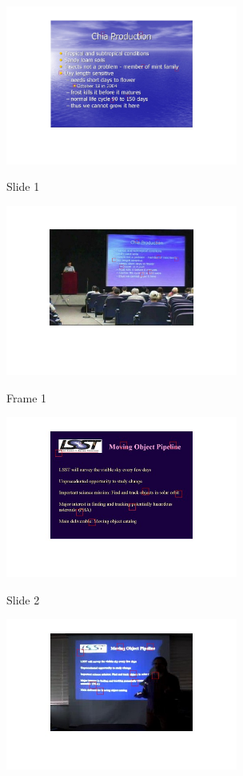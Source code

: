 \clearpage
\begin{figure}[ht]
	\begin{subfigure}{0.5\textwidth}
	    {\includegraphics[width=3in]{figs/vizSlidePts_1.jpg}}
		\caption{Slide 1}
	\end{subfigure}
	\begin{subfigure}{0.5\textwidth}
	    {\includegraphics[width=3in]{figs/vizFramePts_1.jpg}}
		\caption{Frame 1}
	\end{subfigure}
	\begin{subfigure}{0.5\textwidth}
	    {\includegraphics[width=3in]{figs/vizSlidePts_2.jpg}}
		\caption{Slide 2}
	\end{subfigure}
	\begin{subfigure}{0.5\textwidth}
	    {\includegraphics[width=3in]{figs/vizFramePts_2.jpg}}

\end{subfigure}
\end{figure}
